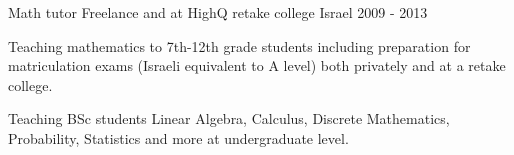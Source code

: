 \documentclass[11pt, a4paper]{awesome-cv}
\begin{document}
\begin{cventries}
  \cventry
    {Math tutor} %
    {Freelance and at HighQ retake college} %
    {Israel} %
    {2009 - 2013} %
    {
      \begin{cvitems} %
        \item {Teaching mathematics to 7th-12th grade students including preparation for matriculation exams (Israeli equivalent to A level) both privately and at a retake college.}
        \item {Teaching BSc students Linear Algebra, Calculus, Discrete Mathematics, Probability, Statistics and more at undergraduate level.}
      \end{cvitems}
    }

\end{cventries}

\end{document}
